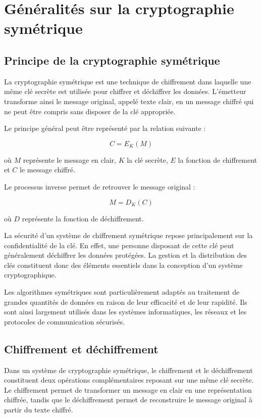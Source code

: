 \documentclass[12pt,a4paper]{article}
\begin{document}
\section{Généralités sur la cryptographie symétrique}


\subsection{Principe de la cryptographie symétrique}

La cryptographie symétrique est une technique de chiffrement dans laquelle une même clé secrète est utilisée pour chiffrer et déchiffrer les données. L'émetteur transforme ainsi le message original, appelé texte clair, en un message chiffré qui ne peut être compris sans disposer de la clé appropriée.

Le principe général peut être représenté par la relation suivante :

\begin{equation}
C = E_K(M)
\end{equation}

où $M$ représente le message en clair, $K$ la clé secrète, $E$ la fonction de chiffrement et $C$ le message chiffré.

Le processus inverse permet de retrouver le message original :

\begin{equation}
M = D_K(C)
\end{equation}

où $D$ représente la fonction de déchiffrement.

La sécurité d'un système de chiffrement symétrique repose principalement sur la confidentialité de la clé. En effet, une personne disposant de cette clé peut généralement déchiffrer les données protégées. La gestion et la distribution des clés constituent donc des éléments essentiels dans la conception d'un système cryptographique.

Les algorithmes symétriques sont particulièrement adaptés au traitement de grandes quantités de données en raison de leur efficacité et de leur rapidité. Ils sont ainsi largement utilisés dans les systèmes informatiques, les réseaux et les protocoles de communication sécurisés.


\subsection{Chiffrement et déchiffrement}


Dans un système de cryptographie symétrique, le chiffrement et le déchiffrement constituent deux opérations complémentaires reposant sur une même clé secrète. Le chiffrement permet de transformer un message en clair en une représentation chiffrée, tandis que le déchiffrement permet de reconstruire le message original à partir du texte chiffré.
\end{document}
